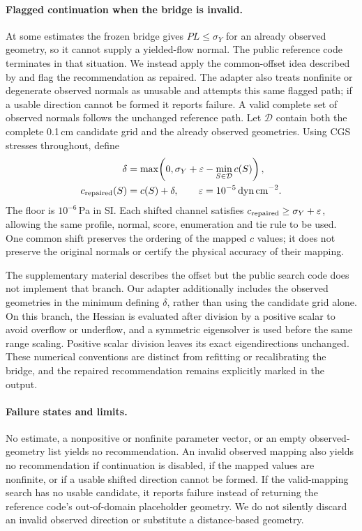 \paragraph{Flagged continuation when the bridge is invalid.}
At some estimates the frozen bridge gives $PL\leq\sigma_Y$ for an
already observed geometry, so it cannot supply a yielded-flow normal.
The public reference code terminates in that situation. We instead apply the
common-offset idea described by \citet[Supplement~A, Sec.~6]{hamamichi2023nonnewtonian}
and flag the recommendation as repaired. The adapter also treats
nonfinite or degenerate observed normals as unusable and attempts this
same flagged path; if a usable direction cannot be formed it reports
failure. A valid complete set of observed normals follows the unchanged
reference path. Let $\mathcal D$ contain both the complete
0.1\,cm candidate grid and the already observed geometries. Using
CGS stresses throughout, define
\[
\begin{aligned}
 \delta&=\max\!\left(0,\sigma_Y+\varepsilon-
                 \min_{S\in\mathcal D}c(S)\right),\\
 c_{\rm repaired}(S)&=c(S)+\delta,\qquad
 \varepsilon=10^{-5}\,\mathrm{dyn\,cm}^{-2}.
\end{aligned}
\]
The floor is $10^{-6}$\,Pa in SI. Each shifted channel satisfies
$c_{\rm repaired}\geq\sigma_Y+\varepsilon$, allowing the same profile,
normal, score, enumeration and tie rule to be used. One common shift
preserves the ordering of the mapped $c$ values; it does not preserve
the original normals or certify the physical accuracy of their mapping.

The supplementary material describes the offset but the public search
code does not implement that branch. Our adapter additionally includes
the observed geometries in the minimum defining $\delta$, rather than
using the candidate grid alone. On this branch, the Hessian is evaluated
after division by a positive scalar to avoid overflow or underflow,
and a symmetric eigensolver is used before the same range scaling.
Positive scalar division leaves its exact eigendirections unchanged.
These numerical conventions are distinct from refitting or
recalibrating the bridge, and the repaired recommendation remains
explicitly marked in the output.

\paragraph{Failure states and limits.}
No estimate, a nonpositive or nonfinite parameter vector, or an empty
observed-geometry list yields no recommendation. An invalid observed
mapping also yields no recommendation if continuation is disabled,
if the mapped values are nonfinite, or if a usable shifted direction
cannot be formed. If the valid-mapping search has no usable candidate,
it reports failure instead of returning the reference code's
out-of-domain placeholder geometry. We do not silently discard an
invalid observed direction or substitute a distance-based geometry.

